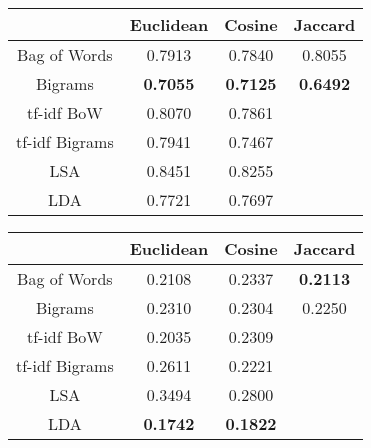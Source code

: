 \documentclass[10pt]{article}
\begin{document}
\begin{center}
\begin{tabular}{|c|c|c|c|}
  \hline
  & Euclidean & Cosine & Jaccard \\ \hline \hline
  Bag of Words & 0.7913 & 0.7840 & 0.8055 \\ \hline
  Bigrams & \textbf{0.7055} & \textbf{0.7125} & \textbf{0.6492} \\ \hline
  tf-idf BoW & 0.8070 & 0.7861 & \\ \hline
  tf-idf Bigrams & 0.7941 & 0.7467 & \\ \hline
  LSA & 0.8451 & 0.8255 & \\ \hline
  LDA & 0.7721 & 0.7697 & \\ \hline
\end{tabular}
\end{center}

\begin{center}
\begin{tabular}{|c|c|c|c|}
  \hline
  & Euclidean & Cosine & Jaccard \\ \hline \hline
  Bag of Words & 0.2108 & 0.2337 & \textbf{0.2113} \\ \hline
  Bigrams & 0.2310 & 0.2304 & 0.2250 \\ \hline
  tf-idf BoW & 0.2035 & 0.2309 & \\ \hline
  tf-idf Bigrams & 0.2611 & 0.2221 & \\ \hline
  LSA & 0.3494 & 0.2800 & \\ \hline
  LDA & \textbf{0.1742} & \textbf{0.1822} & \\ \hline
\end{tabular}
\end{center}
\end{document}
